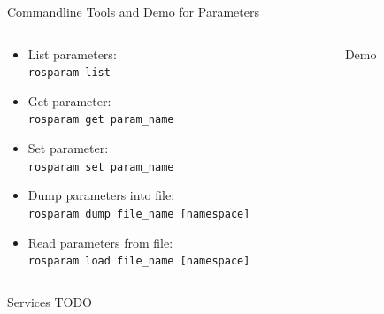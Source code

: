 \documentclass[aspectratio=43]{beamer}
\newcommand{\inline}[1]{\texttt{#1}}
\begin{document}
\begin{frame}{Commandline Tools and Demo for Parameters}
	\begin{columns}
		\begin{column}{0.5\textwidth}
			\begin{itemize}
				\item List parameters:\\\inline{rosparam list}
				\item Get parameter:\\\inline{rosparam get param_name}
				\item Set parameter:\\\inline{rosparam set param_name}
				\item Dump parameters into file:\\\inline{rosparam dump file_name [namespace]}
				\item Read parameters from file:\\\inline{rosparam load file_name [namespace]}
			\end{itemize}
		\end{column}
		\begin{column}{0.5\textwidth}
			\centering
      Demo
		\end{column}
	\end{columns}
\end{frame}

\begin{frame}{Services}
	TODO
\end{frame}
\end{document}
